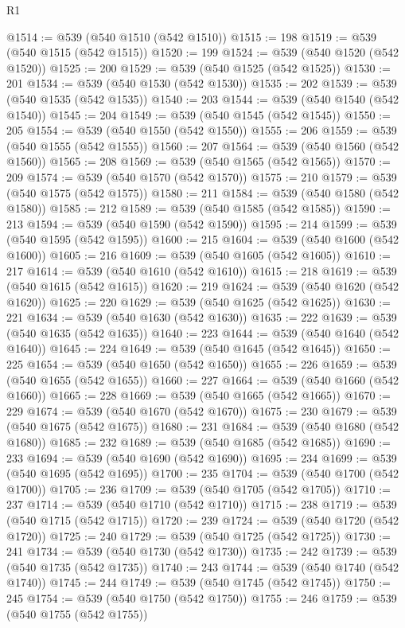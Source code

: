 \begin{lexlean}{R1}
\begin{coremodule}
@1514 := @539 (@540 @1510 (@542 @1510))
@1515 := 198
@1519 := @539 (@540 @1515 (@542 @1515))
@1520 := 199
@1524 := @539 (@540 @1520 (@542 @1520))
@1525 := 200
@1529 := @539 (@540 @1525 (@542 @1525))
@1530 := 201
@1534 := @539 (@540 @1530 (@542 @1530))
@1535 := 202
@1539 := @539 (@540 @1535 (@542 @1535))
@1540 := 203
@1544 := @539 (@540 @1540 (@542 @1540))
@1545 := 204
@1549 := @539 (@540 @1545 (@542 @1545))
@1550 := 205
@1554 := @539 (@540 @1550 (@542 @1550))
@1555 := 206
@1559 := @539 (@540 @1555 (@542 @1555))
@1560 := 207
@1564 := @539 (@540 @1560 (@542 @1560))
@1565 := 208
@1569 := @539 (@540 @1565 (@542 @1565))
@1570 := 209
@1574 := @539 (@540 @1570 (@542 @1570))
@1575 := 210
@1579 := @539 (@540 @1575 (@542 @1575))
@1580 := 211
@1584 := @539 (@540 @1580 (@542 @1580))
@1585 := 212
@1589 := @539 (@540 @1585 (@542 @1585))
@1590 := 213
@1594 := @539 (@540 @1590 (@542 @1590))
@1595 := 214
@1599 := @539 (@540 @1595 (@542 @1595))
@1600 := 215
@1604 := @539 (@540 @1600 (@542 @1600))
@1605 := 216
@1609 := @539 (@540 @1605 (@542 @1605))
@1610 := 217
@1614 := @539 (@540 @1610 (@542 @1610))
@1615 := 218
@1619 := @539 (@540 @1615 (@542 @1615))
@1620 := 219
@1624 := @539 (@540 @1620 (@542 @1620))
@1625 := 220
@1629 := @539 (@540 @1625 (@542 @1625))
@1630 := 221
@1634 := @539 (@540 @1630 (@542 @1630))
@1635 := 222
@1639 := @539 (@540 @1635 (@542 @1635))
@1640 := 223
@1644 := @539 (@540 @1640 (@542 @1640))
@1645 := 224
@1649 := @539 (@540 @1645 (@542 @1645))
@1650 := 225
@1654 := @539 (@540 @1650 (@542 @1650))
@1655 := 226
@1659 := @539 (@540 @1655 (@542 @1655))
@1660 := 227
@1664 := @539 (@540 @1660 (@542 @1660))
@1665 := 228
@1669 := @539 (@540 @1665 (@542 @1665))
@1670 := 229
@1674 := @539 (@540 @1670 (@542 @1670))
@1675 := 230
@1679 := @539 (@540 @1675 (@542 @1675))
@1680 := 231
@1684 := @539 (@540 @1680 (@542 @1680))
@1685 := 232
@1689 := @539 (@540 @1685 (@542 @1685))
@1690 := 233
@1694 := @539 (@540 @1690 (@542 @1690))
@1695 := 234
@1699 := @539 (@540 @1695 (@542 @1695))
@1700 := 235
@1704 := @539 (@540 @1700 (@542 @1700))
@1705 := 236
@1709 := @539 (@540 @1705 (@542 @1705))
@1710 := 237
@1714 := @539 (@540 @1710 (@542 @1710))
@1715 := 238
@1719 := @539 (@540 @1715 (@542 @1715))
@1720 := 239
@1724 := @539 (@540 @1720 (@542 @1720))
@1725 := 240
@1729 := @539 (@540 @1725 (@542 @1725))
@1730 := 241
@1734 := @539 (@540 @1730 (@542 @1730))
@1735 := 242
@1739 := @539 (@540 @1735 (@542 @1735))
@1740 := 243
@1744 := @539 (@540 @1740 (@542 @1740))
@1745 := 244
@1749 := @539 (@540 @1745 (@542 @1745))
@1750 := 245
@1754 := @539 (@540 @1750 (@542 @1750))
@1755 := 246
@1759 := @539 (@540 @1755 (@542 @1755))

\end{coremodule}
\end{lexlean}

